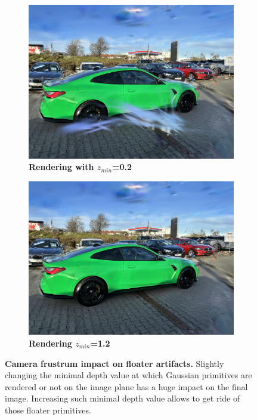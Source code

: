 \begin{figure}[htb!]
  \centering
  \begin{subfigure}[b]{0.45\linewidth}
    \includegraphics[width=\linewidth]{images/gaussiansplatting/needle-artifact.png}
    \caption{\textbf{Rendering with $z_{min}$=0.2} }
  \end{subfigure}
  \quad %
  \begin{subfigure}[b]{0.45\linewidth}
    \includegraphics[width=\linewidth]{images/gaussiansplatting/needle-free-artifact.png}
    \caption{\textbf{Rendering $z_{min}$=1.2} }
  \end{subfigure}
  \caption{\textbf{Camera frustrum impact on floater artifacts.} Slightly changing the minimal depth value at which Gaussian primitives are rendered or not on the image plane has a huge impact on the final image. Increasing such minimal depth value allows to get ride of those floater primitives.}
  \label{fig:floater-removed}
\end{figure}

